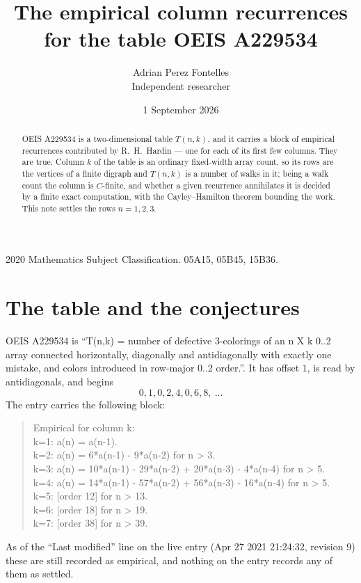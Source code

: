 \documentclass[11pt,a4paper]{article}
\title{The empirical column recurrences for the table OEIS A229534}
\author{Adrian Perez Fontelles\\ \small Independent researcher}
\date{1 September 2026}
\theoremstyle{plain}
\theoremstyle{definition}
\begin{document}
\maketitle

\begin{abstract}
OEIS A229534 is a two-dimensional table $T(n,k)$, and it carries a block of empirical
recurrences contributed by R.~H.~Hardin --- one for each of its first few columns. They are
true. Column $k$ of the table is an ordinary fixed-width array count, so its rows are the
vertices of a finite digraph and $T(n,k)$ is a number of walks in it; being a walk count the
column is $C$-finite, and whether a given recurrence annihilates it is decided by a finite
exact computation, with the Cayley--Hamilton theorem bounding the work. This note settles the rows $n=1, 2, 3$.
\end{abstract}

\noindent\small 2020 Mathematics Subject Classification. 05A15, 05B45, 15B36.\normalsize

\section{The table and the conjectures}

OEIS A229534 is ``T(n,k) = number of defective 3-colorings of an n X k 0..2 array connected horizontally, diagonally and antidiagonally with exactly one mistake, and colors introduced in row-major 0..2 order.''. It has offset $1$, is
read by antidiagonals, and begins
\[
0, 1, 0, 2, 4, 0, 6, 8,\ \dots
\]
The entry carries the following block:
\begin{quote}\small
Empirical for column k:\\
k=1: a(n) = a(n-1).\\
k=2: a(n) = 6*a(n-1) - 9*a(n-2) for n > 3.\\
k=3: a(n) = 10*a(n-1) - 29*a(n-2) + 20*a(n-3) - 4*a(n-4) for n > 5.\\
k=4: a(n) = 14*a(n-1) - 57*a(n-2) + 56*a(n-3) - 16*a(n-4) for n > 5.\\
k=5: [order 12] for n > 13.\\
k=6: [order 18] for n > 19.\\
k=7: [order 38] for n > 39.\\
\end{quote}
As of the ``Last modified'' line on the live entry (Apr 27 2021 21:24:32, revision 9) these are still
recorded as empirical, and nothing on the entry records any of them as settled.
\end{document}
